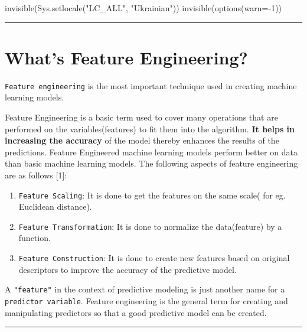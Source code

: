 \documentclass[
  letterpaper,
  DIV=11,
  numbers=noendperiod]{scrreprt}
\newenvironment{Shaded}{\begin{snugshade}}{\end{snugshade}}
\newcommand{\AttributeTok}[1]{\textcolor[rgb]{0.40,0.45,0.13}{#1}}
\newcommand{\DecValTok}[1]{\textcolor[rgb]{0.68,0.00,0.00}{#1}}
\newcommand{\FunctionTok}[1]{\textcolor[rgb]{0.28,0.35,0.67}{#1}}
\newcommand{\NormalTok}[1]{\textcolor[rgb]{0.00,0.23,0.31}{#1}}
\newcommand{\SpecialCharTok}[1]{\textcolor[rgb]{0.37,0.37,0.37}{#1}}
\newcommand{\StringTok}[1]{\textcolor[rgb]{0.13,0.47,0.30}{#1}}
\providecommand{\tightlist}{%
  \setlength{\itemsep}{0pt}\setlength{\parskip}{0pt}}\usepackage{longtable,booktabs,array}
\begin{document}
\begin{Shaded}
\begin{Highlighting}[]
\FunctionTok{invisible}\NormalTok{(}\FunctionTok{Sys.setlocale}\NormalTok{(}\StringTok{"LC\_ALL"}\NormalTok{, }\StringTok{"Ukrainian"}\NormalTok{))}
\FunctionTok{invisible}\NormalTok{(}\FunctionTok{options}\NormalTok{(}\AttributeTok{warn=}\SpecialCharTok{{-}}\DecValTok{1}\NormalTok{))}
\end{Highlighting}
\end{Shaded}

\begin{center}\rule{0.5\linewidth}{0.5pt}\end{center}

\section{What's Feature Engineering?}\label{whats-feature-engineering}

\texttt{Feature\ engineering} is the most important technique used in
creating machine learning models.

Feature Engineering is a basic term used to cover many operations that
are performed on the variables(features) to fit them into the algorithm.
\textbf{It helps in increasing the accuracy} of the model thereby
enhances the results of the predictions. Feature Engineered machine
learning models perform better on data than basic machine learning
models. The following aspects of feature engineering are as follows
{[}1{]}:

\begin{enumerate}
\def\labelenumi{\arabic{enumi}.}
\tightlist
\item
  \texttt{Feature\ Scaling}: It is done to get the features on the same
  scale( for eg. Euclidean distance).
\item
  \texttt{Feature\ Transformation}: It is done to normalize the
  data(feature) by a function.
\item
  \texttt{Feature\ Construction}: It is done to create new features
  based on original descriptors to improve the accuracy of the
  predictive model.
\end{enumerate}

A \texttt{"feature"} in the context of predictive modeling is just
another name for a \texttt{predictor\ variable}. Feature engineering is
the general term for creating and manipulating predictors so that a good
predictive model can be created.

\begin{center}\rule{0.5\linewidth}{0.5pt}\end{center}
\end{document}
